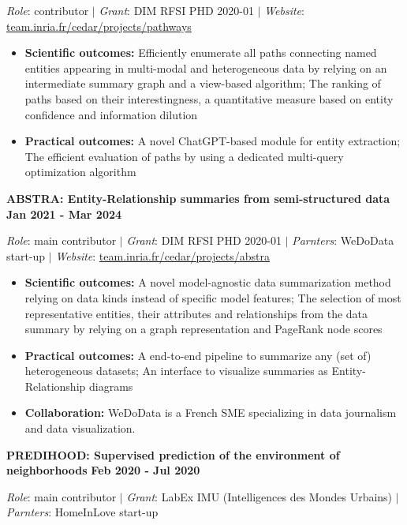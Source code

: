 \documentclass{article}
\begin{document}
\noindent\textit{Role}: contributor $|$ \textit{Grant}: DIM RFSI PHD 2020-01 $|$ \textit{Website}: \href{https://team.inria.fr/cedar/projects/pathways}{team.inria.fr/cedar/projects/pathways}

\begin{itemize}
\item \textbf{Scientific outcomes:} Efficiently enumerate all paths connecting named entities appearing in multi-modal and heterogeneous data by relying on an intermediate summary graph and a view-based algorithm; The ranking of paths based on their interestingness, a quantitative measure based on entity confidence and information dilution
\item \textbf{Practical outcomes:} A novel ChatGPT-based module for entity extraction; The efficient evaluation of paths by using a dedicated multi-query optimization algorithm
\end{itemize}
\vspace{1em}\noindent\textbf{ABSTRA: Entity-Relationship summaries from semi-structured data} \hfill \textbf{Jan 2021 - Mar 2024}


\noindent\textit{Role}: main contributor $|$ \textit{Grant}: DIM RFSI PHD 2020-01 $|$ \textit{Parnters}: WeDoData start-up $|$ \textit{Website}: \href{https://team.inria.fr/cedar/projects/abstra}{team.inria.fr/cedar/projects/abstra}

\begin{itemize}
\item \textbf{Scientific outcomes:} A novel model-agnostic data summarization method relying on data kinds instead of specific model features; The selection of most representative entities, their attributes and relationships from the data summary by relying on a graph representation and PageRank node scores
\item \textbf{Practical outcomes:} A end-to-end pipeline to summarize any (set of) heterogeneous datasets; An interface to visualize summaries as Entity-Relationship diagrams
\item \textbf{Collaboration:} WeDoData is a French SME specializing in data journalism and data visualization.
\end{itemize}
\vspace{1em}\noindent\textbf{PREDIHOOD: Supervised prediction of the environment of neighborhoods} \hfill \textbf{Feb 2020 - Jul 2020}


\noindent\textit{Role}: main contributor $|$ \textit{Grant}: LabEx IMU (Intelligences des Mondes Urbains) $|$ \textit{Parnters}: HomeInLove start-up
\end{document}
